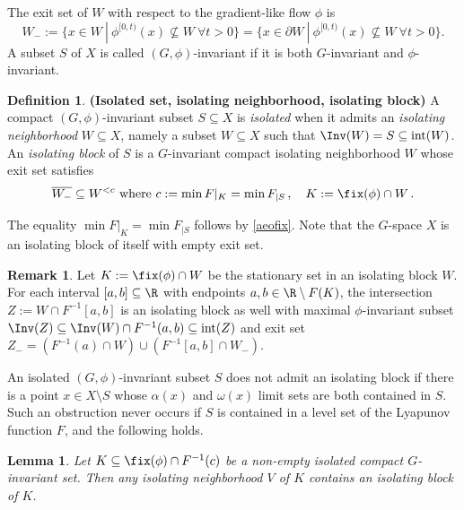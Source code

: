 \documentclass[11pt,a4paper,reqno]{article}
\DeclareMathOperator{\interior}{int}
\numberwithin{equation}{section}
\newtheorem{lemma}[theorem]{Lemma}
\theoremstyle{definition}
\newtheorem{definition}[theorem]{Definition}
\newtheorem{remark}[theorem]{Remark}
\begin{document}
The exit set of $W$ with respect to the gradient-like flow 
$ \phi $ is 
\begin{equation*}
W_-:= \! \big\{ x\in W\ |\ \phi^{[0,t)}(x)\not\subseteq W\ \forall t>0 \big\} \! = \! \big\{ x\in \partial W\ |\ \phi^{[0,t)}(x)\not\subseteq W\ \forall t>0 \big\}.
\end{equation*} 
A subset $ S $ of $ X $   is called 
 $(G,\phi)$-invariant if it is both  $G$-invariant and $\phi$-invariant.
\begin{definition}\label{def:isolated isolating isolating}
{\bf (Isolated set, isolating  neighborhood, isolating block)}
A compact $(G,\phi)$-invariant subset $S\subseteq X$ is  \emph{isolated} when it admits an {\em isolating neighborhood} $W\subseteq X$, namely a subset $W\subseteq X $ such that 
$ \Inv(W) = S \subseteq \interior(W)$.
An \emph{isolating block} of $S$ is a $G$-invariant compact isolating neighborhood $W$ whose exit set  satisfies 
\begin{equation}
\label{exitblock}
\overline{W_-}\subseteq W^{<c} 
\ \text{where} \ 
c:=\min F|_{K} 
= \min
F_{|S} \, , \quad  
K:=\fix(\phi)\cap W \, .
\end{equation}
\end{definition}


The equality 
$ \min F|_{K}  = \min
F_{|S}$ follows by \eqref{aeofix}.
Note that the  $ G$-space $ X $ is an isolating block of itself with empty exit set.


\begin{remark}\label{r:split_block}
Let $K:=\fix(\phi)\cap W$ be the stationary set in an isolating block $W$. For each interval $[a,b]\subseteq\R$ with endpoints $a,b\in\R\setminus F(K)$, the intersection $Z:=W\cap F^{-1}[a,b]$ is an isolating block as well with maximal $\phi$-invariant subset
$ \Inv(Z) \subseteq  \Inv(W) \cap F^{-1}(a,b)  \subseteq \interior(Z) $
and exit set 
$ Z_-=(F^{-1}(a)\cap W)\cup (F^{-1}[a,b]\cap W_-) $.  
\end{remark}

An isolated $(G,\phi)$-invariant subset $S$ does not admit an isolating block if there is a point $x\in X\setminus S$ whose  $\alpha(x)$ and $\omega(x)$ limit sets are both contained in $S$. Such an obstruction  never occurs  if $S$ is contained in a level set of the Lyapunov function $F$, and the following holds.

\begin{lemma}
\label{l:existence_isolating_block}
Let $K\subseteq \fix(\phi)\cap F^{-1}(c)$ be a non-empty isolated compact $G$-invariant set.
Then any isolating neighborhood $V$ of $K$ contains an isolating block of $K$.
\end{lemma}
\end{document}
